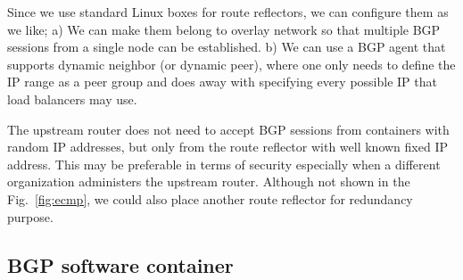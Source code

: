 Since we use standard Linux boxes for route reflectors, we can configure them as we like;
a) We can make them belong to overlay network so that multiple BGP sessions from a single node can be established.
b) We can use a BGP agent that supports dynamic neighbor (or dynamic peer), where one only needs to define the IP range as a peer group and does away with specifying every possible IP that load balancers may use.

The upstream router does not need to accept BGP sessions from containers with random IP addresses, but only from the route reflector with well known fixed IP address. This may be preferable in terms of security especially when a different organization administers the upstream router.
Although not shown in the Fig.~\ref{fig:ecmp}, we could also place another route reflector for redundancy purpose.


\FloatBarrier

\subsection{BGP software container}\label{sec:bgp}

